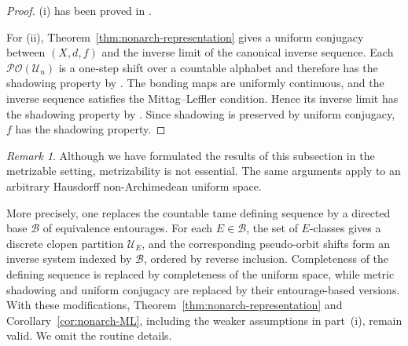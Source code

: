 \documentclass[12pt]{amsart}
\theoremstyle{definition}
\numberwithin{equation}{section}
\theoremstyle{remark}
\newtheorem{remark}[theorem]{Remark}
\begin{document}
\begin{proof}
(i) has been proved in \cite[Theorem 4.2.9(i)]{Darji}.

For (ii), Theorem~\ref{thm:nonarch-representation} gives a uniform
conjugacy between $(X,d,f)$ and the inverse limit of the canonical inverse
sequence. Each $\mathcal{PO}(\mathcal U_n)$ is a one-step shift over a
countable alphabet and therefore has the shadowing property by
\cite[Proposition~2.3.5]{Darji}. The bonding maps are uniformly continuous,
and the inverse sequence satisfies the Mittag--Leffler condition. Hence its
inverse limit has the shadowing property by
\cite[Theorem~4.1.7]{Darji}. Since shadowing is preserved by uniform
conjugacy, $f$ has the shadowing property.
\end{proof}

\begin{remark}\label{rem:general-nonarch}
Although we have formulated the results of this subsection in the metrizable
setting, metrizability is not essential. The same arguments apply to an
arbitrary Hausdorff non-Archimedean uniform space.

More precisely, one replaces the countable tame defining sequence by a
directed base $\mathcal B$ of equivalence entourages. For each
$E\in\mathcal B$, the set of $E$-classes gives a discrete clopen partition
$\mathcal U_E$, and the corresponding pseudo-orbit shifts form an inverse
system indexed by $\mathcal B$, ordered by reverse inclusion. Completeness
of the defining sequence is replaced by completeness of the uniform space,
while metric shadowing and uniform conjugacy are replaced by their
entourage-based versions. With these modifications,
Theorem~\ref{thm:nonarch-representation} and
Corollary~\ref{cor:nonarch-ML}, including the weaker assumptions in
part~{\rm (i)}, remain valid. We omit the routine details.
\end{remark}


\end{document}

